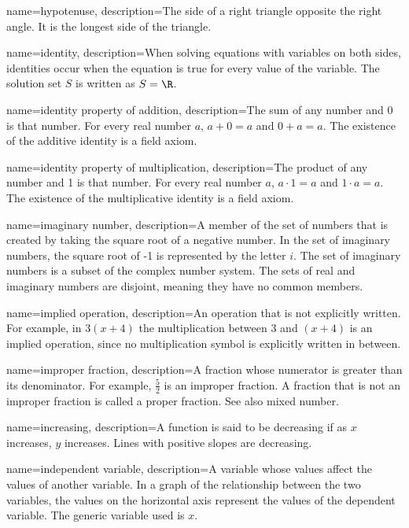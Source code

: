 {
	name=hypotenuse,
	description={The side of a right triangle opposite the right angle. It is the longest side of the triangle.}
}

 {
	name=identity,
	description={When solving equations with variables on both sides, identities occur when the equation is true for every value of the variable. The solution set $S$ is written as $S=\R$.}
}

 {
	name=identity property of addition,
	description={The sum of any number and 0 is that number. For every real number $a$, $a + 0 = a$ and $0 + a = a$. The existence of the \gls{additive identity} is a \gls{field axiom}.}
}

 {
	name=identity property of multiplication,
	description={The product of any number and 1 is that number. For every real number $a$, $a \cdot 1 = a$ and $1 \cdot a = a$. The existence of the multiplicative identity is a \gls{field axiom}.}
}

 {
	name=imaginary number,
	description={A member of the set of numbers that is created by taking the square root of a negative number. In the set of imaginary numbers, the square root of -1 is represented by the letter $i$. The set of imaginary numbers is a subset of the complex number system. The sets of real and imaginary numbers are disjoint, meaning they have no common members.}
}

 {
	name=implied operation,
	description={An operation that is not explicitly written. For example, in $3 (x + 4)$ the multiplication between 3 and $(x + 4)$ is an implied operation, since no multiplication symbol is explicitly written in between.}
}

 {
	name=improper fraction,
	description={A fraction whose \gls{numerator} is greater than its \gls{denominator}. For example, $\frac{5}{2}$ is an improper fraction. A fraction that is not an improper fraction is called a \gls{proper fraction}. See also \gls{mixed number}.}
}

 {
	name=increasing,
	description={A function is said to be decreasing if as $x$ increases, $y$ increases. Lines with positive slopes are decreasing.}
}

 {
	name=independent variable,
	description={A variable whose values affect the values of another variable. In a graph of the relationship between the two variables, the values on the horizontal axis represent the values of the dependent variable. The generic variable used is $x$.}
}

